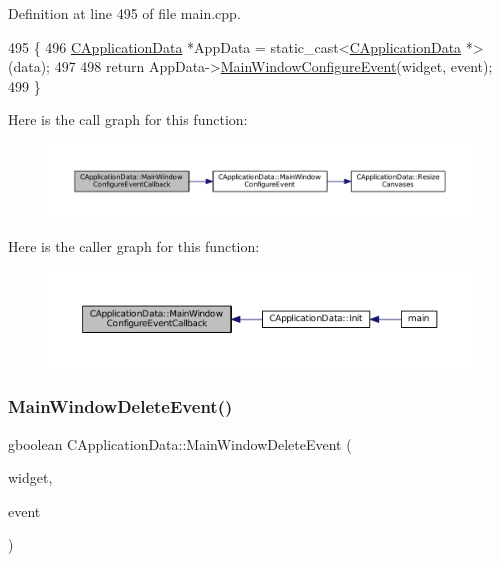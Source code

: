 Definition at line 495 of file main.\+cpp.


\begin{DoxyCode}
495                                                                                                            
       \{
496     \hyperlink{classCApplicationData}{CApplicationData} *AppData = \textcolor{keyword}{static\_cast<}\hyperlink{classCApplicationData}{CApplicationData} *\textcolor{keyword}{>}(data);
497 
498     \textcolor{keywordflow}{return} AppData->\hyperlink{classCApplicationData_a7abef8a548d0ad3adb70f11d8a74176c}{MainWindowConfigureEvent}(widget, event);
499 \}
\end{DoxyCode}
Here is the call graph for this function\+:\nopagebreak
\begin{figure}[H]
\begin{center}
\leavevmode
\includegraphics[width=350pt]{classCApplicationData_a31b48405b43d73cabca4c080c1b9beee_cgraph}
\end{center}
\end{figure}
Here is the caller graph for this function\+:\nopagebreak
\begin{figure}[H]
\begin{center}
\leavevmode
\includegraphics[width=350pt]{classCApplicationData_a31b48405b43d73cabca4c080c1b9beee_icgraph}
\end{center}
\end{figure}
\hypertarget{classCApplicationData_afd73780d7dca117edbe341cb3c908c04}{}\label{classCApplicationData_afd73780d7dca117edbe341cb3c908c04} 
\subsubsection{\texorpdfstring{Main\+Window\+Delete\+Event()}{MainWindowDeleteEvent()}}
{\footnotesize\ttfamily gboolean C\+Application\+Data\+::\+Main\+Window\+Delete\+Event (\begin{DoxyParamCaption}\item[{Gtk\+Widget $\ast$}]{widget,  }\item[{Gdk\+Event $\ast$}]{event }\end{DoxyParamCaption})\hspace{0.3cm}{\ttfamily [protected]}}



